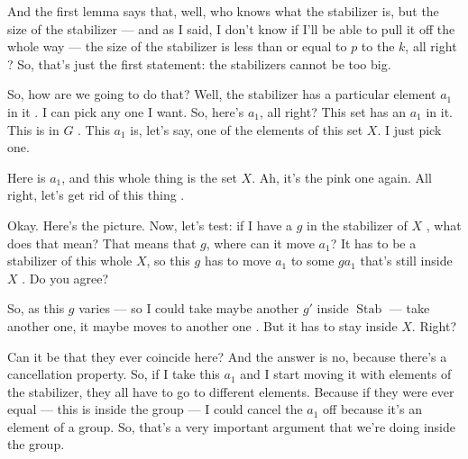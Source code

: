 \begin{proofWrapper}
\begin{speech}[00:07:47 - 00:08:10]
And the first lemma says that, well, who knows what the stabilizer is, but the size of the stabilizer --- and as I said, I don't know if I'll be able to pull it off the whole way --- the size of the stabilizer is less than or equal to $p$ to the $k$, all right ? So, that's just the first statement: the stabilizers cannot be too big.
\end{speech}

\begin{content}
\end{content}

\begin{speech}[00:08:10 - 00:10:03]
So, how are we going to do that? Well, the stabilizer has a particular element $a_1$ in it . I can pick any one I want. So, here's $a_1$, all right? This set has an $a_1$ in it. This is in $G$ . This $a_1$ is, let's say, one of the elements of this set $X$. I just pick one.

Here is $a_1$, and this whole thing is the set $X$. Ah, it's the pink one again. All right, let's get rid of this thing .

Okay. Here's the picture. Now, let's test: if I have a $g$ in the stabilizer of $X$ , what does that mean? That means that $g$, where can it move $a_1$? It has to be a stabilizer of this whole $X$, so this $g$ has to move $a_1$ to some $g a_1$ that's still inside $X$ . Do you agree?

So, as this $g$ varies --- so I could take maybe another $g'$ inside $\operatorname{Stab}$  --- take another one, it maybe moves to another one . But it has to stay inside $X$. Right?

Can it be that they ever coincide here? And the answer is no, because there's a cancellation property. So, if I take this $a_1$ and I start moving it with elements of the stabilizer, they all have to go to different elements. Because if they were ever equal --- this is inside the group --- I could cancel the $a_1$ off because it's an element of a group. So, that's a very important argument that we're doing inside the group.
\end{speech}


\end{proofWrapper}
